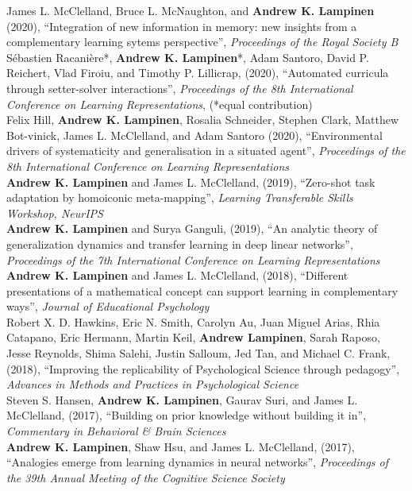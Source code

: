 \documentclass[margin]{res}
\begin{document}
\begin{resume}
James L. McClelland, Bruce L. McNaughton, and \textbf{Andrew K. Lampinen} (2020), {``Integration of new information in memory: new insights from a complementary learning sytems perspective''}, \textit{Proceedings of the Royal Society B} \\[5pt]
S\'ebastien Racani\`ere*, \textbf{Andrew K. Lampinen}*, Adam Santoro, David P. Reichert, Vlad Firoiu, and Timothy P. Lillicrap, (2020), {``Automated curricula through setter-solver interactions'',} \textit{Proceedings of the 8th International Conference on Learning Representations}, (*equal contribution) \\ [5pt] 
Felix Hill, \textbf{Andrew K. Lampinen}, Rosalia Schneider, Stephen Clark, Matthew Bot-vinick, James L. McClelland, and Adam Santoro (2020), {``Environmental drivers of systematicity and generalisation in a situated agent'',} \textit{Proceedings of the 8th International Conference on Learning Representations} \\ [5pt] 
\textbf{Andrew K. Lampinen} and James L. McClelland, (2019), {``Zero-shot task adaptation by homoiconic meta-mapping'',} \textit{Learning Transferable Skills Workshop, NeurIPS} \\ [5pt] 
\textbf{Andrew K. Lampinen} and Surya Ganguli, (2019), {``An analytic theory of generalization dynamics and transfer learning in deep linear networks'',} \textit{Proceedings of the 7th International Conference on Learning Representations} \\[5pt] 
\textbf{Andrew K. Lampinen} and James L. McClelland, (2018), {``Different presentations of a mathematical concept can support learning in complementary ways'',} \textit{Journal of Educational Psychology} \\[5pt]
 Robert X. D. Hawkins, Eric N. Smith, Carolyn Au, Juan Miguel Arias, Rhia Catapano, Eric Hermann, Martin Keil, \textbf{Andrew Lampinen}, Sarah Raposo, Jesse Reynolds, Shima Salehi, Justin Salloum, Jed Tan, and Michael C. Frank, (2018), {``Improving the replicability of Psychological Science through pedagogy'',}  \textit{Advances in Methods and Practices in Psychological Science} \\ [5pt]
Steven S. Hansen, \textbf{Andrew K. Lampinen}, Gaurav Suri, and James L. McClelland, (2017), {``Building on prior knowledge without building it in'',} \textit{Commentary in Behavioral \& Brain Sciences}  \\[5pt]
\textbf{Andrew K. Lampinen}, Shaw Hsu, and James L. McClelland, (2017), {``Analogies emerge from learning dynamics in neural networks'',} \textit{Proceedings of the 39th Annual Meeting of the Cognitive Science Society}  


\end{resume}
\end{document}
